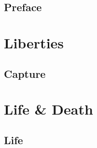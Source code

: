 \documentclass{book}
\begin{document}
  \tableofcontents

  \frontmatter
    \chapter{Preface}

  \mainmatter
  \part{Liberties}
    \chapter{Capture}
  \part{Life \& Death}
    \chapter{Life}
\end{document}
